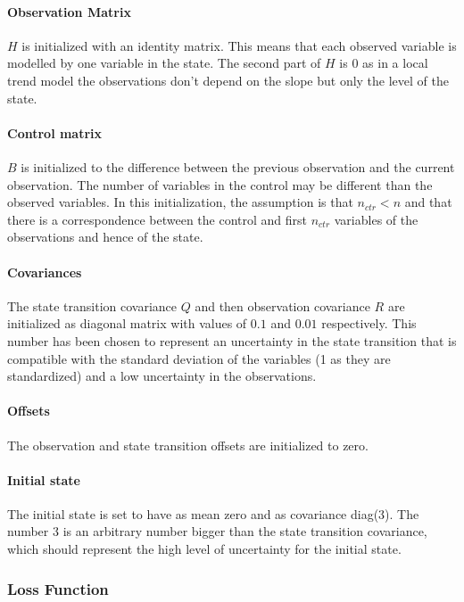 \documentclass{article}
\begin{document}
\paragraph{Observation Matrix} $H$ is initialized with an identity matrix. This means that each observed variable is modelled by one variable in the state. The second part of $H$ is 0 as in a local trend model the observations don't depend on the slope but only the level of the state.

\paragraph{Control matrix} $B$ is initialized to the difference between the previous observation and the current observation. The number of  variables in the control may be different than the observed variables. In this initialization, the assumption is that $n_{ctr} < n$ and that there is a correspondence between the control and first $n_{ctr}$ variables of the observations and hence of the state.

\paragraph{Covariances} The state transition covariance $Q$ and then observation covariance $R$ are initialized as diagonal matrix with values of $0.1$ and $0.01$ respectively. This number has been chosen to represent an uncertainty in the state transition that is compatible with the standard deviation of the variables (1 as they are standardized) and a low uncertainty in the observations. 

\paragraph{Offsets} The observation and state transition offsets are initialized to zero.

\paragraph{Initial state} The initial state is set to have as mean zero and as covariance diag(3). The number 3 is an arbitrary number bigger than the state transition covariance, which should represent the high level of uncertainty for the initial state.  

\subsubsection{Loss Function}
\end{document}
